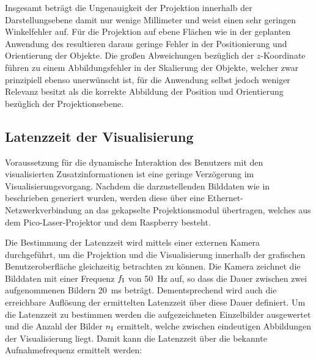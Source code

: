 Insgesamt beträgt die Ungenauigkeit der Projektion innerhalb der Darstellungsebene damit nur wenige Millimeter und weist einen sehr geringen Winkelfehler auf. Für die Projektion auf ebene Flächen wie in der geplanten Anwendung des  resultieren daraus geringe Fehler in der Positionierung und Orientierung der Objekte. Die großen Abweichungen bezüglich der $z$-Koordinate führen zu einem Abbildungsfehler in der Skalierung der Objekte, welcher zwar prinzipiell ebenso unerwünscht ist, für die Anwendung selbst jedoch weniger Relevanz besitzt als die korrekte Abbildung der Position und Orientierung bezüglich der Projektionsebene.\\

\prever{
}


%

\subsection{Latenzzeit der Visualisierung}
Voraussetzung für die dynamische Interaktion des Benutzers mit den visualisierten Zusatzinformationen ist eine geringe Verzögerung im Visualisierungsvorgang. Nachdem die darzustellenden Bilddaten wie in  beschrieben generiert wurden, werden diese über eine Ethernet-Netzwerkverbindung an das gekapselte Projektionsmodul übertragen, welches aus dem Pico-Laser-Projektor und dem Raspberry besteht.\\

\prever{
}

Die Bestimmung der Latenzzeit wird mittels einer externen Kamera durchgeführt, um die Projektion und die Visualisierung innerhalb der grafischen Benutzeroberfläche gleichzeitig betrachten zu können. Die Kamera zeichnet die Bilddaten mit einer Frequenz $f_{\mathrm{I}}$ von \SI{50}{\Hz} auf, so dass die Dauer zwischen zwei aufgenommenen Bildern \SI{20}{\milli\second} beträgt. Dementsprechend wird auch die erreichbare Auflösung der ermittelten Latenzzeit über diese Dauer definiert. Um die Latenzzeit zu bestimmen werden die aufgezeichneten Einzelbilder ausgewertet und die Anzahl der Bilder $n_{\mathrm{I}}$ ermittelt, welche zwischen eindeutigen Abbildungen der Visualisierung liegt. Damit kann die Latenzzeit über die bekannte Aufnahmefrequenz ermittelt werden:

